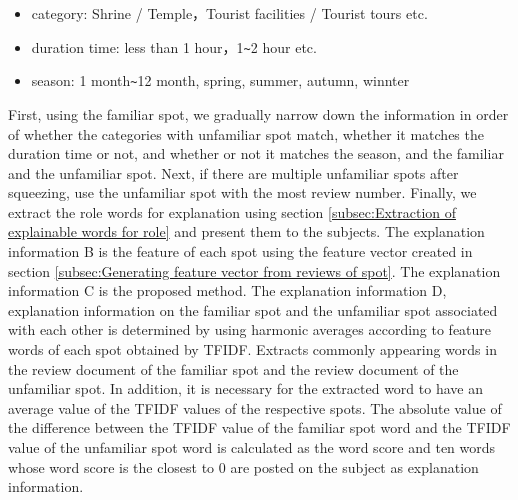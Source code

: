\documentclass[journal]{IAENGtran}
\begin{document}
\begin{itemize}
\item category: Shrine / Temple，Tourist facilities / Tourist tours etc.
\item duration time: less than 1 hour，1\verb|~|2 hour etc.
\item season: 1 month\verb|~|12 month, spring, summer, autumn, winnter
\end{itemize}

First, using the familiar spot, we gradually narrow down the information in order of whether the categories with unfamiliar spot match, whether it matches the duration time or not, and whether or not it matches the season, and the familiar and the unfamiliar spot.
Next, if there are multiple unfamiliar spots after squeezing, use the unfamiliar spot with the most review number.
Finally, we extract the role words for explanation using section \ref{subsec:Extraction of explainable words for role} and present them to the subjects.
The explanation information B is the feature of each spot using the feature vector created in section \ref{subsec:Generating feature vector from reviews of spot}.
The explanation information C is the proposed method.
The explanation information D, explanation information on the familiar spot and the unfamiliar spot associated with each other is determined by using harmonic averages according to feature words of each spot obtained by TFIDF.
Extracts commonly appearing words in the review document of the familiar spot and the review document of the unfamiliar spot.
In addition, it is necessary for the extracted word to have an average value of the TFIDF values ​​of the respective spots.
The absolute value of the difference between the TFIDF value of the familiar spot word and the TFIDF value of the unfamiliar spot word is calculated as the word score and ten words whose word score is the closest to 0 are posted on the subject as explanation information.
\end{document}
